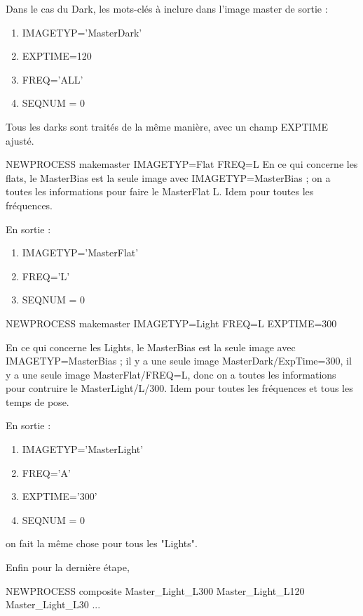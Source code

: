 \documentclass[10pt,a4paper,french]{article}
\newcommand{\be}{\begin{enumerate}}
\newcommand{\ee}{\end{enumerate}}
\begin{document}
Dans le cas du Dark, les mots-clés à inclure dans l'image master de sortie :
\vspace{.5cm}
\be
\item IMAGETYP='MasterDark'
\item EXPTIME=120
\item FREQ='ALL'
\item SEQNUM = 0
\ee
\vspace{.5cm}
Tous les darks sont traités de la même manière, avec un champ EXPTIME ajusté.
\vspace{.5cm}

\item NEWPROCESS makemaster IMAGETYP=Flat FREQ=L
En ce qui concerne les flats, le MasterBias est la seule image avec IMAGETYP=MasterBias ;
on a toutes les informations pour faire le MasterFlat L. Idem pour toutes les
fréquences.

En sortie :

\be
\item IMAGETYP='MasterFlat'
\item FREQ='L'
\item SEQNUM = 0
\ee
\vspace{.5cm}

\item NEWPROCESS makemaster IMAGETYP=Light FREQ=L EXPTIME=300

\vspace{.5cm}
En ce qui concerne les Lights, le MasterBias est la seule image avec IMAGETYP=MasterBias ;
il y a une seule image MasterDark/ExpTime=300, il y a une seule image MasterFlat/FREQ=L,
donc on a toutes les informations pour contruire le MasterLight/L/300. Idem pour toutes les
fréquences et tous les temps de pose.

En sortie :

\be
\item IMAGETYP='MasterLight'
\item FREQ='A'
\item EXPTIME='300'
\item SEQNUM = 0
\ee
\vspace{.5cm}
on fait la même chose pour tous les "Lights".

\vspace{.5cm}
Enfin pour la dernière étape, 
\vspace{.5cm}

\item NEWPROCESS composite Master\_Light\_L300 Master\_Light\_L120 Master\_Light\_L30 ...
\vspace{.5cm}
\end{document}
